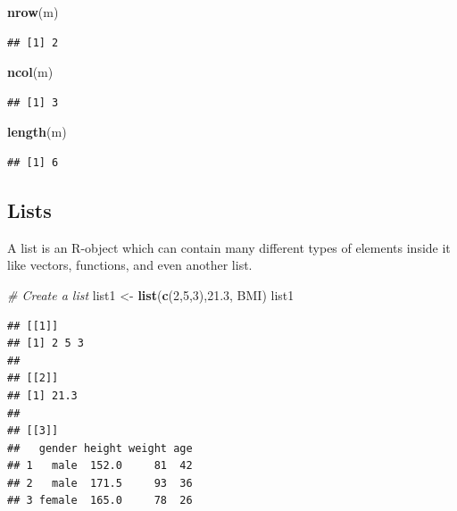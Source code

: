 \documentclass[]{book}
\newenvironment{Shaded}{\begin{snugshade}}{\end{snugshade}}
\newcommand{\CommentTok}[1]{\textcolor[rgb]{0.56,0.35,0.01}{\textit{#1}}}
\newcommand{\DecValTok}[1]{\textcolor[rgb]{0.00,0.00,0.81}{#1}}
\newcommand{\FloatTok}[1]{\textcolor[rgb]{0.00,0.00,0.81}{#1}}
\newcommand{\KeywordTok}[1]{\textcolor[rgb]{0.13,0.29,0.53}{\textbf{#1}}}
\newcommand{\NormalTok}[1]{#1}
\newcommand{\StringTok}[1]{\textcolor[rgb]{0.31,0.60,0.02}{#1}}
\begin{document}
\begin{Shaded}
\begin{Highlighting}[]
\KeywordTok{nrow}\NormalTok{(m)}
\end{Highlighting}
\end{Shaded}

\begin{verbatim}
## [1] 2
\end{verbatim}

\begin{Shaded}
\begin{Highlighting}[]
\KeywordTok{ncol}\NormalTok{(m)}
\end{Highlighting}
\end{Shaded}

\begin{verbatim}
## [1] 3
\end{verbatim}

\begin{Shaded}
\begin{Highlighting}[]
\KeywordTok{length}\NormalTok{(m)}
\end{Highlighting}
\end{Shaded}

\begin{verbatim}
## [1] 6
\end{verbatim}

\hypertarget{lists}{%
\subsection*{Lists}\label{lists}}

A list is an R-object which can contain many different types of elements inside it like vectors, functions, and even another list.

\begin{Shaded}
\begin{Highlighting}[]
\CommentTok{# Create a list}
\NormalTok{list1 <-}\StringTok{ }\KeywordTok{list}\NormalTok{(}\KeywordTok{c}\NormalTok{(}\DecValTok{2}\NormalTok{,}\DecValTok{5}\NormalTok{,}\DecValTok{3}\NormalTok{),}\FloatTok{21.3}\NormalTok{, BMI)}
\NormalTok{list1}
\end{Highlighting}
\end{Shaded}

\begin{verbatim}
## [[1]]
## [1] 2 5 3
## 
## [[2]]
## [1] 21.3
## 
## [[3]]
##   gender height weight age
## 1   male  152.0     81  42
## 2   male  171.5     93  36
## 3 female  165.0     78  26
\end{verbatim}
\end{document}
